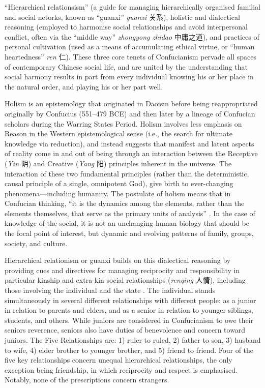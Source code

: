 {``Hierarchical relationsism'' (a guide for managing hierarchically organised familial and social netorks, known as ``guanxi'' \textit{guanxi} 关系), holistic and dialectical reasoning (employed to harmonise social relationships and avoid interpersonal conflict, often via the ``middle way'' \textit{zhongyong zhidao} 中庸之道), and practices of personal cultivation (used as a means of accumulating ethical virtue, or ``human heartedness'' \textit{ren} 仁).   These three core tenets of Confucianism pervade all spaces of contemporary Chinese social life, and are united by the understanding that social harmony results in part from every individual knowing his or her place in the natural order, and playing his or her part well.

Holism is an epistemology that originated in Daoism before being reappropriated originally by Confucius (551–479 BCE) and then later by a lineage of Confucian scholars during the Warring States Period.  Holism involves less emphasis on Reason in the Western epistemological sense (i.e., the search for ultimate knowledge via reduction), and instead suggests that manifest and latent aspects of reality come in and out of being through an interaction between the Receptive (\textit{Yin} 阴) and Creative (\textit{Yang} 阳) principles inherent in the universe.  The interaction of these two fundamental principles (rather than the deterministic, causal principle of a single, omnipotent God), give birth to ever-changing phenomena---including humanity.  The postulate of holism means that in Confucian thinking, ``it is the dynamics among the elements, rather than the elements themselves, that serve as the primary units of analysis'' \citep[156]{Ji2010}. In the case of knowledge of the social, it is not an unchanging human biology that should be the focal point of interest, but dynamic and evolving patterns of family, groups, society, and culture.

Hierarchical relationism or guanxi builds on this dialectical reasoning by providing cues and directives for managing reciprocity and responsibility in particular kinship and extra-kin social relationships (\textit{renqing} 人情), including those involving the individual and the state \citep{Maehr1980}.  The individual stands simultaneously in several different relationships with different people: as a junior in relation to parents and elders, and as a senior in relation to younger siblings, students, and others. While juniors are considered in Confucianism to owe their seniors reverence, seniors also have duties of benevolence and concern toward juniors. The Five Relationships are: 1) ruler to ruled, 2) father to son, 3) husband to wife, 4) elder brother to younger brother, and 5) friend to friend. Four of the five key relationships concern unequal hierarchical relationships, the only exception being friendship, in which reciprocity and respect is emphasised.  Notably, none of the prescriptions concern strangers.

}
